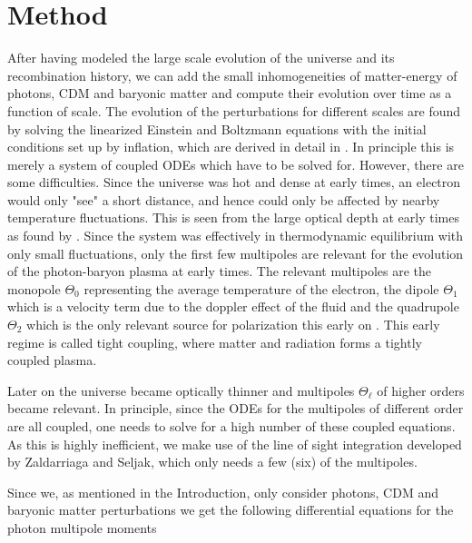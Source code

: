 \documentclass[twocolumn]{aastex62}
\begin{document}
\section{Method} \label{sec:Method}
After having modeled the large scale evolution of the universe and its recombination history, we can add the small inhomogeneities of matter-energy of photons, CDM and baryonic matter and compute their evolution over time as a function of scale. The evolution of the perturbations for different scales are found by solving the linearized Einstein and Boltzmann equations with the initial conditions set up by inflation, which are derived in detail in \cite{dodelson:2003}. In principle this is merely a system of coupled ODEs which have to be solved for. However, there are some difficulties. Since the universe was hot and dense at early times, an electron would only "see" a short distance, and hence could only be affected by nearby temperature fluctuations. This is seen from the large optical depth at early times as found by \cite{stutzer:2020b}. Since the system was effectively in thermodynamic equilibrium with only small fluctuations, only the first few multipoles are relevant for the evolution of the photon-baryon plasma at early times. The relevant multipoles are the monopole $\Theta_0$ representing the average temperature of the electron, the dipole $\Theta_1$ which is a velocity term due to the doppler effect of the fluid and the quadrupole $\Theta_2$ which is the only relevant source for polarization this early on \citep[]{winther:2020b}. This early regime is called tight coupling, where matter and radiation forms a tightly coupled plasma.

Later on the universe became optically thinner and multipoles $\Theta_\ell$ of higher orders became relevant. In principle, since the ODEs for the multipoles of different order are all coupled, one needs to solve for a high number of these coupled equations. As this is highly inefficient, we make use of the line of sight integration developed by Zaldarriaga and Seljak, which only needs a few (six) of the multipoles. 

Since we, as mentioned in the Introduction, only consider photons, CDM and baryonic matter perturbations we get the following differential equations for the photon multipole moments
\end{document}
